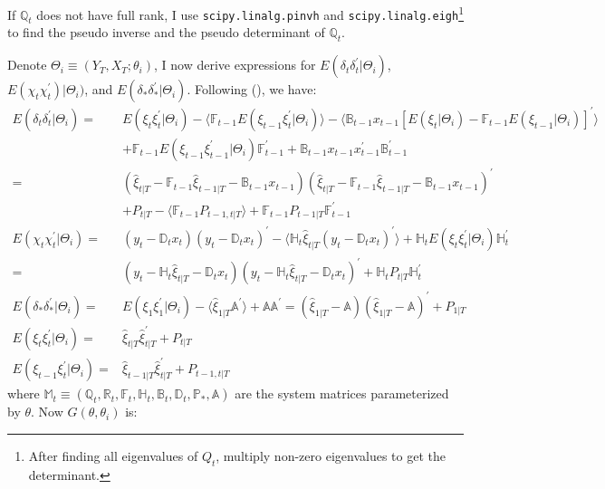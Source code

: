\documentclass[10pt, titlepage]{article}
\numberwithin{equation}{section}
\begin{document}
If $\mathbb{Q}_t$ does not have full rank, I use \texttt{scipy.linalg.pinvh} and \texttt{scipy.linalg.eigh}\footnote{After finding all eigenvalues of $Q_t$, multiply non-zero eigenvalues to get the determinant.} to find the pseudo inverse and the pseudo determinant of $\mathbb{Q}_t$.

Denote $\Theta_i\equiv (Y_T,X_T;\theta_i)$, I now derive expressions for $E(\delta_t\delta_t^{'}|\Theta_i)$, $E(\chi_t\chi_t^{'})|\Theta_i)$, and $E(\delta_*\delta_*^{'}|\Theta_i)$. Following (\cite{koopman1992exact}), we have:
\begin{align}
    E(\delta_t\delta_t^{'}|\Theta_i) =& E(\xi_t\xi_t^{'}|\Theta_i) - \langle \mathbb{F}_{t-1}E(\xi_{t-1}\xi_t^{'}|\Theta_i)\rangle 
        - \langle \mathbb{B}_{t-1}x_{t-1}[E(\xi_t|\Theta_i) - \mathbb{F}_{t-1}E(\xi_{t-1}|\Theta_i)]^{'}\rangle \nonumber \\
        &+\mathbb{F}_{t-1}E(\xi_{t-1}\xi_{t-1}^{'}|\Theta_i)\mathbb{F}_{t-1}^{'} + \mathbb{B}_{t-1}x_{t-1}x_{t-1}^{'}\mathbb{B}_{t-1}^{'} \nonumber \\
    =& (\hat{\xi}_{t|T}-\mathbb{F}_{t-1}\hat{\xi}_{t-1|T}-\mathbb{B}_{t-1}x_{t-1})(\hat{\xi}_{t|T}-\mathbb{F}_{t-1}\hat{\xi}_{t-1|T}-\mathbb{B}_{t-1}x_{t-1})^{'} \nonumber \\
    &+ P_{t|T} - \langle \mathbb{F}_{t-1}P_{t-1,t|T} \rangle + \mathbb{F}_{t-1}P_{t-1|T}\mathbb{F}_{t-1}^{'} \label{eq:delta_t} \\
    E(\chi_t\chi_t^{'}|\Theta_i) =& (y_t-\mathbb{D}_tx_t)(y_t-\mathbb{D}_tx_t)^{'}-\langle \mathbb{H}_t\hat{\xi}_{t|T}(y_t-\mathbb{D}_tx_t)^{'}\rangle + \mathbb{H}_tE(\xi_t\xi_t^{'}|\Theta_i)\mathbb{H}_t^{'} \nonumber \\
    =& (y_t - \mathbb{H}_t\hat{\xi}_{t|T} - \mathbb{D}_tx_t)(y_t - \mathbb{H}_t\hat{\xi}_{t|T} - \mathbb{D}_tx_t)^{'} + \mathbb{H}_tP_{t|T}\mathbb{H}_t^{'} \label{eq:chi_t} \\ 
    E(\delta_*\delta_*^{'}|\Theta_i) =& E(\xi_1\xi_1^{'}|\Theta_i) - \langle\hat{\xi}_{1|T}\mathbb{A}^{'}\rangle + \mathbb{A}\mathbb{A}^{'}=(\hat{\xi}_{1|T} - \mathbb{A})(\hat{\xi}_{1|T} - \mathbb{A})^{'} + P_{1|T} \label{eq:delta_0} \\
    E(\xi_t\xi_t^{'}|\Theta_i) =& \hat{\xi}_{t|T}\hat{\xi}_{t|T}^{'} + P_{t|T} \nonumber \\
    E(\xi_{t-1}\xi_t^{'}|\Theta_i) =& \hat{\xi}_{t-1|T}\hat{\xi}_{t|T}^{'} + P_{t-1,t|T} \nonumber
\end{align}
where $\mathbb{M}_t \equiv (\mathbb{Q}_t, \mathbb{R}_t, \mathbb{F}_t, \mathbb{H}_t, \mathbb{B}_t, \mathbb{D}_t, \mathbb{P}_{*}, \mathbb{A})$ are the system matrices parameterized by $\theta$. Now $G(\theta,\theta_{i})$ is:
\end{document}
